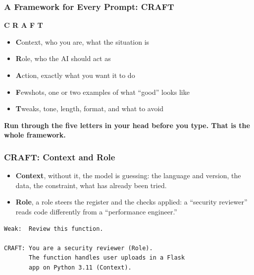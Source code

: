 \begin{frame}[fragile]\frametitle{A Framework for Every Prompt: CRAFT}

\begin{center}
\Large \textbf{C R A F T}
\end{center}

\medskip
\begin{itemize}
    \item \textbf{C}ontext, who you are, what the situation is
    \item \textbf{R}ole, who the AI should act as
    \item \textbf{A}ction, exactly what you want it to do
    \item \textbf{F}ewshots, one or two examples of what ``good'' looks like
    \item \textbf{T}weaks, tone, length, format, and what to avoid
\end{itemize}

\medskip
\begin{center}
\textbf{Run through the five letters in your head before you type. That is the whole framework.}
\end{center}

\end{frame}

\begin{frame}[fragile]\frametitle{CRAFT: Context and Role}

\begin{itemize}
    \item \textbf{Context}, without it, the model is guessing: the language and version, the data, the constraint, what has already been tried.
    \item \textbf{Role}, a role steers the register and the checks applied: a ``security reviewer'' reads code differently from a ``performance engineer.''
\end{itemize}

\begin{lstlisting}[language=HTML]
Weak:  Review this function.

CRAFT: You are a security reviewer (Role).
       The function handles user uploads in a Flask
       app on Python 3.11 (Context).
\end{lstlisting}

\end{frame}

